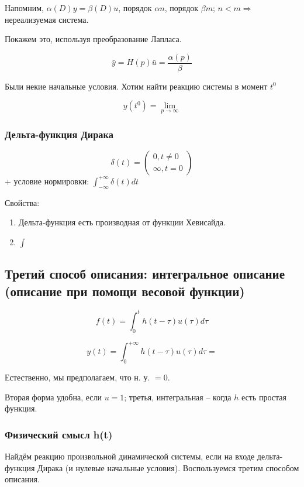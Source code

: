 \documentclass[main.tex]{subfiles}
\begin{document}
Напомним, $ \alpha(D)y = \beta(D) u $, порядок $ \alpha n $, порядок $ \beta m $; $ n < m \Rightarrow $ нереализуемая система.

Покажем это, используя преобразование Лапласа.

$$ \bar y = H(p) \bar u = \frac{\alpha(p)}{\beta} $$

Были некие начальные условия.
Хотим найти реакцию системы в момент $t^0$

$$ y(t^0) = \lim_{p \to \infty} $$ %

\subsubsection{ Дельта-функция Дирака }

$$ \delta(t) = \begin{pmatrix}
	0, t \ne 0 \\
	\infty, t = 0
 \end{pmatrix} $$
+ условие нормировки: $ \int_{- \infty}^{+ \infty} \delta(t) dt $

Свойства:


\begin{enumerate}[noitemsep]
	\item Дельта-функция есть производная от функции Хевисайда.
	\item $ \int $ %
\end{enumerate}

\subsection{Третий способ описания: интегральное описание (описание при помощи весовой функции)}

$$ f(t) = \int_0^t h(t - \tau) u(\tau) d \tau $$


$$ y(t) = \int_{0}^{+ \infty}h(t - \tau)u(\tau) d\tau =  $$

Естественно, мы предполагаем, что н. у. $ =0 $.

Вторая форма удобна, если $ u = 1 $; третья, интегральная -- когда $ h $ есть простая функция.

\subsubsection{Физический смысл h(t)}

Найдём реакцию произвольной динамической системы, если на входе дельта-функция Дирака (и нулевые начальные условия).
Воспользуемся третим способом описания.
\end{document}
